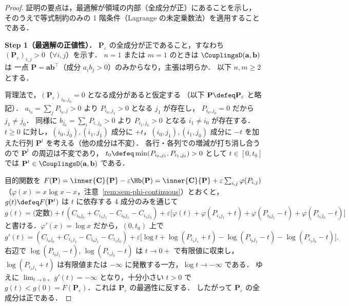 \begin{proof}
  証明の要点は，最適解が領域の内部（全成分が正）にあることを示し，
  そのうえで等式制約のみの 1 階条件（Lagrange の未定乗数法）を適用することである．

  \textbf{Step 1（最適解の正値性）．}
  $\mathbf{P}_\varepsilon$ の全成分が正であること，すなわち
  $(\mathbf{P}_\varepsilon)_{i,j} > 0$（$\forall i, j$）を示す．
  $n = 1$ または $m = 1$ のときは $\CouplingsD(\mathbf{a}, \mathbf{b})$ は
  一点 $\mathbf{P} = \mathbf{a}\mathbf{b}^\top$（成分 $a_i b_j > 0$）のみからなり，主張は明らか．
  以下 $n, m \geq 2$ とする．

  背理法で，$(\mathbf{P}_\varepsilon)_{i_0, j_0} = 0$ となる成分があると仮定する
  （以下 $\mathbf{P} \defeq \mathbf{P}_\varepsilon$ と略記）．
  $a_{i_0} = \sum_j P_{i_0, j} > 0$ より $P_{i_0, j_1} > 0$ となる $j_1$ が存在し，
  $P_{i_0, j_0} = 0$ だから $j_1 \neq j_0$．
  同様に $b_{j_0} = \sum_i P_{i, j_0} > 0$ より $P_{i_1, j_0} > 0$ となる $i_1 \neq i_0$ が存在する．
  $t \geq 0$ に対し，$(i_0, j_0), (i_1, j_1)$ 成分に $+t$，$(i_0, j_1), (i_1, j_0)$ 成分に $-t$
  を加えた行列 $\mathbf{P}^t$ を考える（他の成分は不変）．
  各行・各列での増減が打ち消し合うので $\mathbf{P}^t$ の周辺は不変であり，
  $t_0 \defeq \min(P_{i_0, j_1}, P_{i_1, j_0}) > 0$ として
  $t \in [0, t_0]$ では $\mathbf{P}^t \in \CouplingsD(\mathbf{a}, \mathbf{b})$ である．

  目的関数を $F(\mathbf{P}) = \inner{\mathbf{C}}{\mathbf{P}} - \varepsilon\Hb(\mathbf{P})
  = \inner{\mathbf{C}}{\mathbf{P}} + \varepsilon\sum_{i,j}\varphi(P_{i,j})$
  （$\varphi(x) = x\log x - x$，注意~\ref{rem:sem-phi-continuous}）とおくと，
  $g(t) \defeq F(\mathbf{P}^t)$ は $t$ に依存する 4 成分のみを通じて
  \[
    g(t) = \text{(定数)}
    + t\,(C_{i_0 j_0} + C_{i_1 j_1} - C_{i_0 j_1} - C_{i_1 j_0})
    + \varepsilon\bigl[\varphi(t) + \varphi(P_{i_1 j_1} + t)
      + \varphi(P_{i_0 j_1} - t) + \varphi(P_{i_1 j_0} - t)\bigr]
  \]
  と書ける．$\varphi'(x) = \log x$ だから，$(0, t_0)$ 上で
  \[
    g'(t) = (C_{i_0 j_0} + C_{i_1 j_1} - C_{i_0 j_1} - C_{i_1 j_0})
    + \varepsilon\bigl[\log t + \log(P_{i_1 j_1} + t)
      - \log(P_{i_0 j_1} - t) - \log(P_{i_1 j_0} - t)\bigr].
  \]
  右辺で $\log(P_{i_0 j_1} - t)$, $\log(P_{i_1 j_0} - t)$ は $t \to 0+$ で有限値に収束し，
  $\log(P_{i_1 j_1} + t)$ は有限値または $-\infty$ に発散する一方，$\log t \to -\infty$ である．
  ゆえに $\lim_{t \to 0+} g'(t) = -\infty$ となり，十分小さい $t > 0$ で
  $g(t) < g(0) = F(\mathbf{P}_\varepsilon)$．これは $\mathbf{P}_\varepsilon$ の最適性に反する．
  したがって $\mathbf{P}_\varepsilon$ の全成分は正である．


\end{proof}
